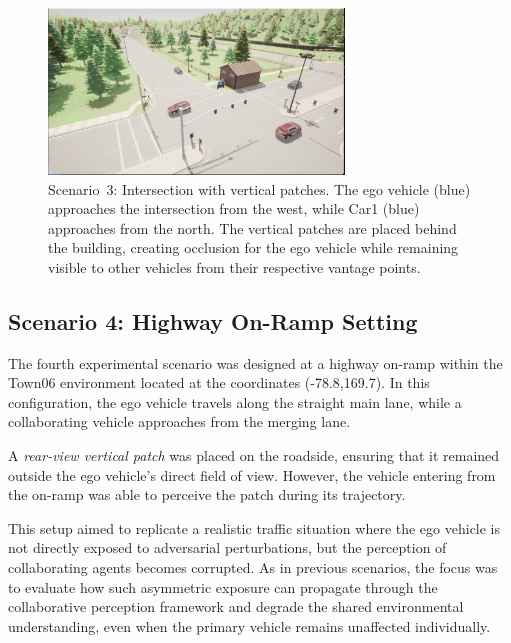 \begin{figure}[H]
    \centering
    \includegraphics[width=0.7\textwidth]{figures/experiments/scenario3_v1.png}
    \caption{Scenario~3: Intersection with vertical patches. 
    The ego vehicle (blue) approaches the intersection from the west, while Car1 (blue) 
    approaches from the north. The vertical patches are placed behind the building, 
    creating occlusion for the ego vehicle while remaining visible to other vehicles 
    from their respective vantage points.}
    \label{fig:scenario3_intersection}
\end{figure}

\subsection{Scenario 4: Highway On-Ramp Setting}
\label{subsec:scenario4}

The fourth experimental scenario was designed at a highway on-ramp within the 
Town06 environment located at the coordinates (-78.8,169.7). In this configuration, the ego vehicle travels along the 
straight main lane, while a collaborating vehicle approaches from the merging lane.  

A \textit{rear-view vertical patch} was placed on the roadside, ensuring that it remained 
outside the ego vehicle’s direct field of view. However, the vehicle entering 
from the on-ramp was able to perceive the patch during its trajectory.  

This setup aimed to replicate a realistic traffic situation where the ego 
vehicle is not directly exposed to adversarial perturbations, but the 
perception of collaborating agents becomes corrupted. As in previous 
scenarios, the focus was to evaluate how such asymmetric exposure can 
propagate through the collaborative perception framework and degrade the 
shared environmental understanding, even when the primary vehicle remains 
unaffected individually.  

